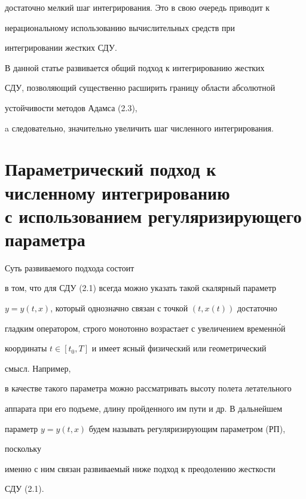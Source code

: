 достаточно мелкий шаг интегрирования. Это в свою очередь приводит к 


нерациональному использованию вычислительных средств при 


интегрировании жестких СДУ. 


 


В данной статье развивается общий подход к интегрированию жестких 


СДУ, позволяющий существенно расширить границу области абсолютной 


устойчивости методов Адамса (2.3), 


a следовательно, значительно увеличить шаг численного интегрирования. 


 


 


\section{Параметрический подход к численному интегрированию\protect\\


с использованием регуляризирующего параметра} 


 


Суть развиваемого подхода состоит 


в том, что для СДУ (2.1) всегда можно указать такой скалярный параметр 


$y=y(t,x)$, который однозначно связан с точкой $(t,x(t))$ достаточно 


гладким оператором, строго монотонно возрастает с увеличением временн\'ой 


координаты $t\in[t_0,T]$ и имеет ясный физический или геометрический 


смысл. Например, 


в качестве такого параметра можно рассматривать высоту полета летательного 


аппарата при его подъеме, длину пройденного им пути и др. В дальнейшем 


параметр $y=y(t,x)$ будем называть регуляризирующим параметром (РП), 


поскольку 


именно с ним связан развиваемый ниже подход к преодолению жесткости 


СДУ (2.1). 


 



